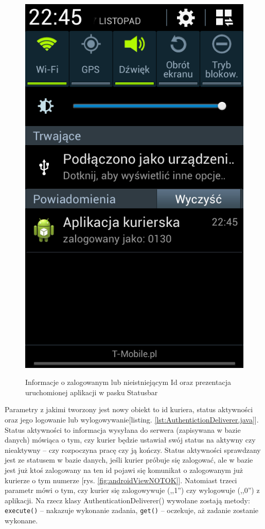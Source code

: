 \documentclass[eng,printmode,oneside]{mgr}
\begin{document}
\begin{figure}
{\includegraphics[height=0.35\textheight]{andBarZal.png}
\label{fig:androidViewtask}
}
\caption{Informacje o zalogowanym lub nieistniejącym Id oraz prezentacja
uruchomionej aplikacji w pasku Statusbar}
\end{figure}

Parametry z jakimi tworzony jest
nowy obiekt to id kuriera, status aktywności oraz jego logowanie lub
wylogowywanie[listing. \ref{lst:AuthentictionDeliverer.java}]. Status aktywności to
informacja wysyłana do serwera (zapisywana w bazie danych) mówiąca o tym, czy kurier będzie ustawiał swój status na aktywny
czy nieaktywny -- czy rozpoczyna pracę czy ją kończy. Status aktywności
sprawdzany jest ze statusem w bazie danych, jeśli kurier próbuje się zalogować,
ale w bazie jest już ktoś zalogowany na ten id pojawi się komunikat o
zalogowanym już kurierze o tym numerze [rys. \ref{fig:androidViewNOTOK}].
Natomiast trzeci parametr mówi o tym, czy kurier się zalogowywuje (,,1'') czy
wylogowuje (,,0'') z aplikacji. Na rzecz klasy AuthenticationDeliverer()
wywołane zostają metody:
\texttt{execute()} -- nakazuje wykonanie zadania, \texttt{get()} -- oczekuje, aż
zadanie zostanie wykonane.
\end{document}
